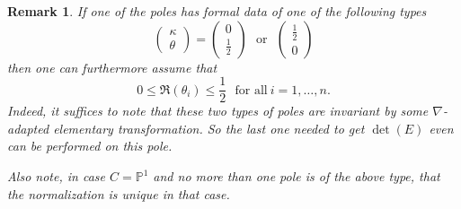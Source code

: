\documentclass[12]{amsart}
\newtheorem{remark}[thm]{Remark}
\begin{document}
\begin{remark}\label{rem:normalizedequation}
If one of the poles has formal data of one of the following types
$$\begin{pmatrix}\kappa\\ \theta\end{pmatrix}=\begin{pmatrix}0\\ \frac{1}{2}\end{pmatrix}\ \ \ \text{or}\ \ \ 
\begin{pmatrix}\frac{1}{2}\\ 0\end{pmatrix}$$
then one can furthermore assume that 
$$0\le\Re(\theta_i)\le\frac{1}{2}\ \ \ \text{for all}\ i=1,\ldots,n.$$
Indeed, it suffices to note that these two types of poles are invariant by some $\nabla$-adapted 
elementary transformation. So the last one needed to get $\det(E)$ even can be performed 
on this pole. 

Also note, in case $C=\mathbb P^1$ and no more than one pole is of the above type, that the normalization
is unique in that case.
\end{remark}
\end{document}

